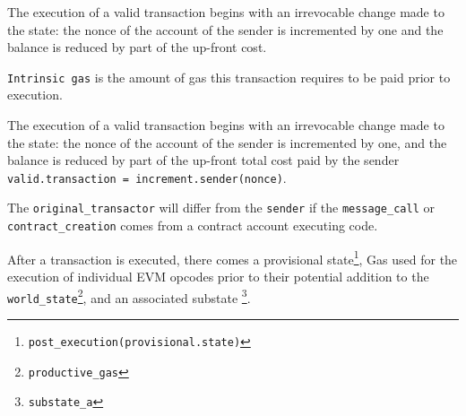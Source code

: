 \documentclass[10pt,a4paper,oneside]{scrartcl}
\begin{document}
The execution of a valid transaction begins with an irrevocable change made to the state: the nonce of the account of the sender is incremented by one and the balance is reduced by part of the up-front cost.

\texttt{Intrinsic gas} is the amount of gas this transaction requires to be paid prior to execution.

The execution of a valid transaction begins with an irrevocable change made to the state: the nonce of the account of the sender is incremented by one, and the balance is reduced by part of the up-front total cost paid by the sender \texttt{valid.transaction = increment.sender(nonce)}. 

The \texttt{original\_transactor} will differ from the \texttt{sender} if the \texttt{message\_call} or \texttt{contract\_creation} comes from a contract account executing code.
\par

After a transaction is executed, there comes a provisional state\footnote{\texttt{post\_execution(provisional.state)}}, Gas used for the execution of individual EVM opcodes prior to their potential addition to the \texttt{world\_state}\footnote{\texttt{productive\_gas}}, and an associated substate \footnote{\texttt{substate\_a}}. 
\end{document}
